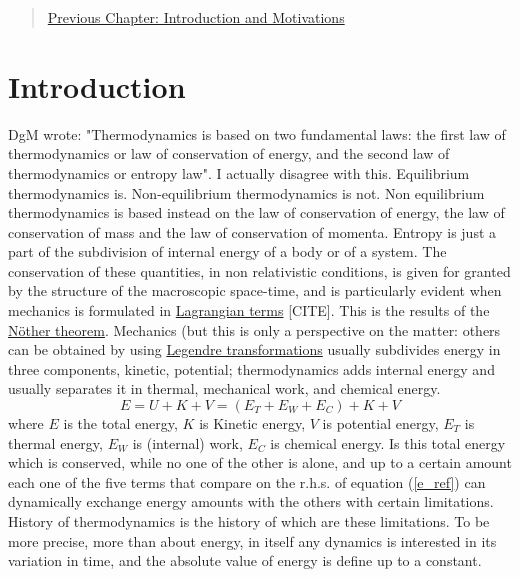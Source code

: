 \begin{quote}
\href{https://www.authorea.com/users/24891/articles/130803/_show_article}{Previous Chapter: Introduction  and Motivations}
\end{quote}

\section{Introduction}

DgM wrote: "Thermodynamics is based on two fundamental laws: the first law of thermodynamics or law of conservation of energy, and the second law of thermodynamics or entropy law".  I actually disagree with this. Equilibrium thermodynamics is. Non-equilibrium thermodynamics is not. Non equilibrium thermodynamics is based instead on the law of conservation of energy, the law of conservation of mass and the law of conservation of momenta. Entropy is just a part of the subdivision of internal energy of a body or of a system. The conservation of these quantities, in non relativistic conditions, is given for granted by the structure of the macroscopic space-time, and is particularly evident when mechanics is formulated in \href{https://en.wikipedia.org/wiki/Lagrangian_mechanics}{Lagrangian terms} [CITE]. This is the results of the \href{https://en.wikipedia.org/wiki/Noether%27s_theorem}{Nöther theorem}. 
Mechanics (but this is only a perspective on the matter: others can be obtained by using \href{https://en.wikipedia.org/wiki/Legendre_transformation}{Legendre transformations} usually subdivides energy in three components, kinetic, potential; thermodynamics adds internal  energy and usually separates it in thermal, mechanical work, and chemical energy.
\begin{equation}
E = U  + K + V = (E_T + E_W + E_C) + K + V
\label{e_cons}
\end{equation}
where $E$ is the total energy, $K$ is Kinetic energy, $V$ is potential energy, $E_T$ is thermal energy, $E_W$ is (internal) work, $E_C$ is chemical energy. Is this total energy which is conserved, while no one of the other is alone, and up to a certain amount each one of the five terms that compare on the r.h.s. of equation (\ref{e_ref}) can dynamically exchange energy amounts with the others with certain limitations. 
History of thermodynamics is the history of which are these limitations. To be more precise, more than about energy, in itself any dynamics is interested in its variation in time, and the absolute value of energy is define up to a constant. 
